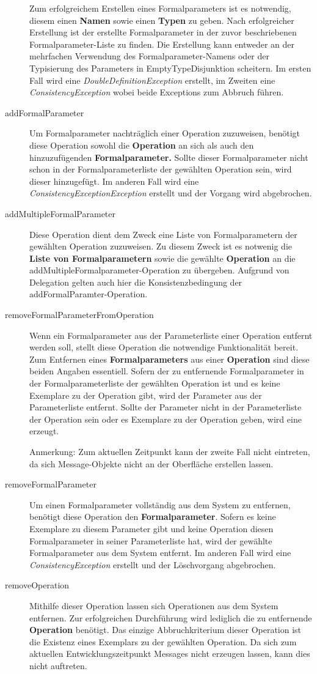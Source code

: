 \begin{description}
Zum erfolgreichem Erstellen eines Formalparameters ist es notwendig, diesem einen \textbf{Namen} sowie einen \textbf{Typen} zu geben. Nach erfolgreicher Erstellung ist der erstellte Formalparameter in der zuvor beschriebenen Formalparameter-Liste zu finden. Die Erstellung kann entweder an der mehrfachen Verwendung des Formalparameter-Namens oder der Typisierung des Parameters in EmptyTypeDisjunktion scheitern. Im ersten Fall wird eine \emph{DoubleDefinitionException} erstellt, im Zweiten eine \emph{ConsistencyException} wobei beide Exceptions zum Abbruch führen.
\item[addFormalParameter]
Um Formalparameter nachträglich einer Operation zuzuweisen, benötigt diese Operation sowohl die \textbf{Operation} an sich als auch den hinzuzufügenden \textbf{Formalparameter.} Sollte dieser Formalparameter nicht schon in der Formalparameterliste der gewählten Operation sein, wird dieser hinzugefügt. Im anderen Fall wird eine \emph{ConsistencyExceptionException} erstellt und der Vorgang wird abgebrochen.
\item[addMultipleFormalParameter]
Diese Operation dient dem Zweck eine Liste von Formalparametern der gewählten Operation zuzuweisen.
Zu diesem Zweck ist es notwenig die \textbf{Liste von Formalparametern} sowie 
die gewählte \textbf{Operation} an die addMultipleFormalparameter-Operation zu übergeben. 
Aufgrund von Delegation gelten auch hier die Konsistenzbedingung der addFormalParamter-Operation. 
\item[removeFormalParameterFromOperation]
Wenn ein Formalparameter aus der Parameterliste einer Operation entfernt werden soll, stellt diese Operation die notwendige Funktionalität bereit. 
Zum Entfernen eines \textbf{Formalparameters} aus einer \textbf{Operation} sind diese beiden Angaben essentiell. 
Sofern der zu entfernende Formalparameter in der Formalparameterliste der gewählten Operation ist und es keine Exemplare zu der Operation gibt, 
wird der Parameter aus der Parameterliste entfernt.
Sollte der Parameter nicht in der Parameterliste der Operation sein oder es Exemplare zu der Operation geben, wird eine  erzeugt.

Anmerkung: Zum aktuellen Zeitpunkt kann der zweite Fall nicht eintreten, da sich Message-Objekte nicht an der Oberfläche erstellen lassen.
\item[removeFormalParameter]
Um einen Formalparameter vollständig aus dem System zu entfernen, benötigt diese Operation den \textbf{Formalparameter}. Sofern es keine Exemplare zu diesem Parameter gibt und keine Operation diesen Formalparameter in seiner Parameterliste hat, wird der gewählte Formalparameter aus dem System entfernt. Im anderen Fall wird eine \emph{ConsistencyException} erstellt und der Löschvorgang abgebrochen.
\item[removeOperation]
Mithilfe dieser Operation lassen sich Operationen aus dem System entfernen. Zur erfolgreichen Durchführung wird lediglich die zu entfernende \textbf{Operation} benötigt. Das einzige Abbruchkriterium dieser Operation ist die Existenz eines Exemplars zu der gewählten Operation. Da sich zum aktuellen Entwicklungszeitpunkt Messages nicht erzeugen lassen, kann dies nicht auftreten.


\end{description}
